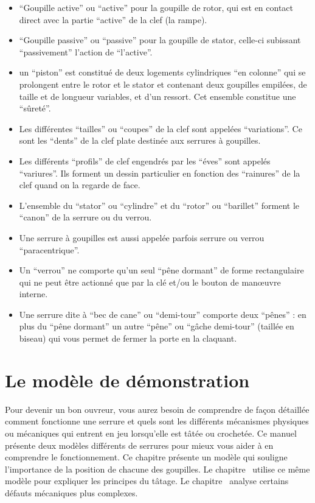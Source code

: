 \documentclass[a4paper,french,11pt,twoside]{report}
\begin{document}
\begin{itemize}
	\item{\enquote{Goupille active} ou \enquote{active} pour la goupille de rotor, qui est en contact direct avec la partie \enquote{active} de la clef (la rampe).}
	\item{\enquote{Goupille passive} ou \enquote{passive} pour la goupille de stator, celle-ci subissant \enquote{passivement} l'action de \enquote{l'active}.}
	\item{un \enquote{piston} est constitué de deux logements cylindriques \enquote{en colonne} qui se prolongent entre le rotor et le stator et contenant deux goupilles empilées, de taille et de longueur variables, et d'un ressort. Cet ensemble constitue une \enquote{sûreté}.}
	\item{Les différentes \enquote{tailles} ou \enquote{coupes} de la clef sont appelées \enquote{variations}. Ce sont les \enquote{dents} de la clef plate destinée aux serrures à goupilles.}
	\item{Les différents \enquote{profils} de clef engendrés par les \enquote{éves} sont appelés \enquote{variures}. Ils forment un dessin particulier en fonction des \enquote{rainures} de la clef quand on la regarde de face.}
	\item{L'ensemble du \enquote{stator} ou \enquote{cylindre} et du \enquote{rotor} ou \enquote{barillet} forment le \enquote{canon} de la serrure ou du verrou.}
    \item{Une serrure à goupilles est aussi appelée parfois serrure ou verrou \enquote{paracentrique}.}
	\item{Un \enquote{verrou} ne comporte qu'un seul \enquote{pêne dormant} de forme rectangulaire qui ne peut être actionné que par la clé et/ou le bouton de manœuvre interne.}
	\item{Une serrure dite à \enquote{bec de cane} ou \enquote{demi-tour} comporte deux \enquote{pênes} : en plus du \enquote{pêne dormant} un autre \enquote{pêne} ou \enquote{gâche demi-tour} (taillée en biseau) qui vous permet de fermer la porte en la claquant.}
\end{itemize}


\chapter{\label{chap:modele_demonstration}Le modèle de démonstration}

Pour devenir un bon ouvreur, vous aurez besoin de comprendre de façon détaillée comment fonctionne une serrure et quels sont les différents mécanismes physiques ou mécaniques qui entrent en jeu lorsqu'elle est tâtée ou crochetée. Ce manuel présente deux modèles différents de serrures pour mieux vous aider à en comprendre le fonctionnement. Ce chapitre présente un modèle qui souligne l'importance de la position de chacune des goupilles. Le chapitre~ utilise ce même modèle pour expliquer les principes du tâtage. Le chapitre~ analyse certains défauts mécaniques plus complexes.
\end{document}
